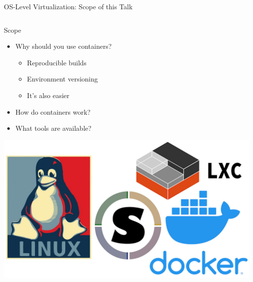 \documentclass[10pt, compress, aspectratio=169, xcolor={table,usenames,dvipsnames}]{beamer}
\begin{document}
\begin{frame}[label={sec:orga03bebe}]{OS-Level Virtualization: Scope of this Talk}
\begin{columns}
\begin{column}{0.4\columnwidth}
\begin{block}{Scope}
\begin{itemize}
\item Why should you \alert{use containers}?
\begin{itemize}
\item Reproducible builds
\item Environment versioning
\item It's also \alert{easier}
\end{itemize}
\item How do containers \alert{work}?
\item What \alert{tools} are available?
\end{itemize}

\begin{center}
\includegraphics[width=.8\columnwidth]{../../img/containers.jpg}
\end{center}
\end{block}
\end{column}


\end{columns}
\end{frame}
\end{document}
